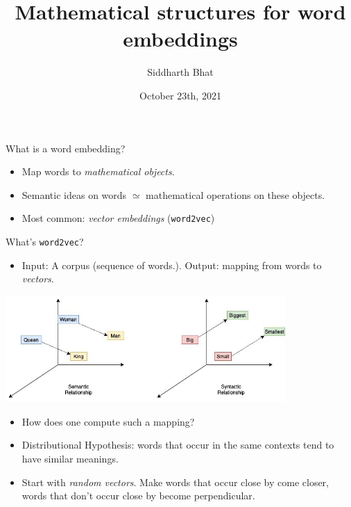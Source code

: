 \documentclass[8pt]{beamer}
\author{Siddharth Bhat}
\date{October 23th, 2021}
\institute{IIIT Hyderabad}
\title{Mathematical structures for word embeddings}
\begin{document}
\maketitle

\begin{frame}[label=sec-1]{What is a word embedding?}
  \pause
\begin{itemize}
  \item Map words to \emph{mathematical objects}.  \pause
  \item Semantic ideas on words $\simeq$ mathematical operations on these objects. \pause
  \item Most common: \emph{vector embeddings} (\texttt{word2vec}) \pause
\end{itemize}
\end{frame}


\begin{frame}{What's \texttt{word2vec}?}
\begin{itemize}
    \item Input: A corpus (sequence of words.). Output: mapping from words to \emph{vectors}.\pause
\end{itemize}
\includegraphics[width=0.8\textwidth]{w2v-linear-relationship.jpeg} \pause
\begin{itemize}
    \item How does one compute such a mapping?  \pause
    \item Distributional Hypothesis: words that occur in the same contexts tend to have similar meanings.\pause
    \item Start with \emph{random vectors}. Make words that occur close by come closer, words that don't occur close by become perpendicular.\pause
\end{itemize}
\end{frame}
\end{document}
